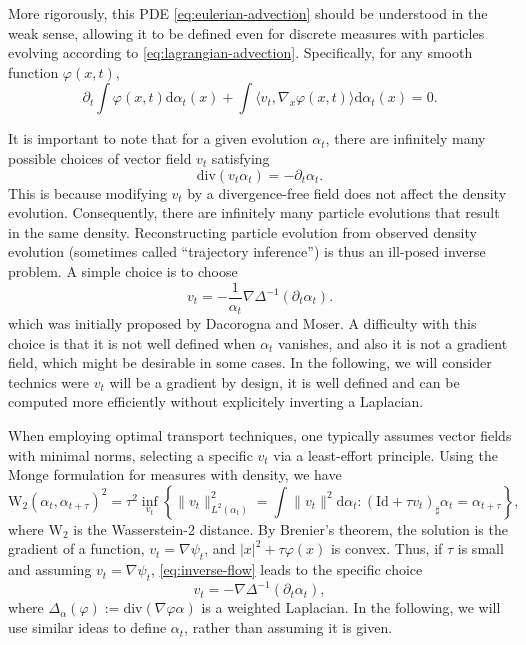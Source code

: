 More rigorously, this PDE \eqref{eq:eulerian-advection} should be understood in the weak sense, allowing it to be defined even for discrete measures with particles evolving according to \eqref{eq:lagrangian-advection}. Specifically, for any smooth function $\varphi(x, t)$,
\begin{equation}
    \partial_t \int \varphi(x, t) \mathrm{d} \alpha_t(x) 
    + \int \langle v_t, \nabla_x \varphi(x, t) \rangle \mathrm{d} \alpha_t(x) = 0.
\end{equation}

It is important to note that for a given evolution $\alpha_t$, there are infinitely many possible choices of vector field $v_t$ satisfying
\begin{equation}
    \mathrm{div}(v_t \alpha_t) = -\partial_t \alpha_t. \label{eq:inverse-flow}
\end{equation}
This is because modifying $v_t$ by a divergence-free field does not affect the density evolution. Consequently, there are infinitely many particle evolutions that result in the same density. Reconstructing particle evolution from observed density evolution (sometimes called ``trajectory inference'') is thus an ill-posed inverse problem.
%
A simple choice is to choose  
\begin{equation}\label{eq:dacorogna-moser}
    v_t = - \frac{1}{\alpha_t} \nabla \Delta^{-1}(\partial_t \alpha_t).
\end{equation}
which was initially proposed by Dacorogna and Moser. A difficulty with this choice is that it is not well defined when $\alpha_t$ vanishes, and also it is not a gradient field, which might be desirable in some cases. In the following, we will consider technics were $v_t$ will be a gradient by design, it is well defined and can be computed more efficiently without explicitely inverting a Laplacian.  

When employing optimal transport techniques, one typically assumes vector fields with minimal norms, selecting a specific $v_t$ via a least-effort principle. Using the Monge formulation for measures with density, we have
\begin{equation}
    \mathrm{W}_2(\alpha_t, \alpha_{t+\tau})^2 = \tau^2 \inf_{v_t} \left\{ \|v_t\|_{L^2(\alpha_t)}^2 = \int \|v_t\|^2 \mathrm{d} \alpha_t : (\mathrm{Id} + \tau v_t)_\sharp \alpha_t = \alpha_{t+\tau} \right\}, \label{eq:monge-field}
\end{equation}
where $\mathrm{W}_2$ is the Wasserstein-2 distance. By Brenier's theorem, the solution is the gradient of a function, $v_t = \nabla \psi_t$, and $|x|^2 + \tau \varphi(x)$ is convex. Thus, if $\tau$ is small and assuming $v_t = \nabla \psi_t$, \eqref{eq:inverse-flow} leads to the specific choice
\begin{equation}
    v_t = -  \nabla \Delta^{-1}(\partial_t \alpha_t),
\end{equation}
where $\Delta_\alpha(\varphi) := \mathrm{div}(\nabla \varphi \alpha)$ is a weighted Laplacian. 
%
In the following, we will use similar ideas to define $\alpha_t$, rather than assuming it is given.


